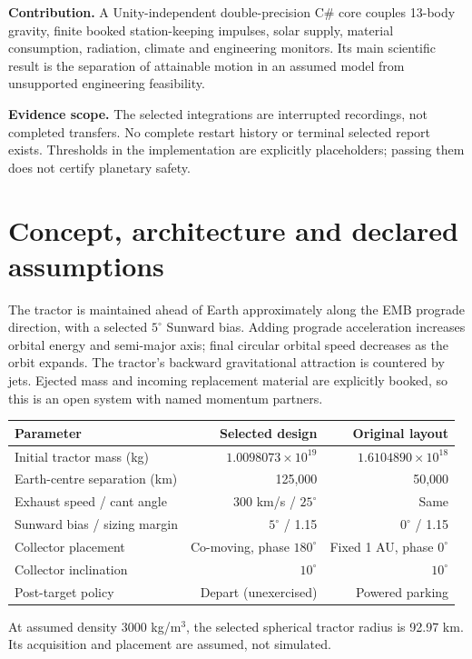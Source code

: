 ﻿\documentclass[10pt,a4paper]{article}
\begin{document}
\textbf{Contribution.} A Unity-independent double-precision C\# core couples 13-body gravity, finite booked station-keeping impulses, solar supply, material consumption, radiation, climate and engineering monitors. Its main scientific result is the separation of attainable motion in an assumed model from unsupported engineering feasibility.

\textbf{Evidence scope.} The selected integrations are interrupted recordings, not completed transfers. No complete restart history or terminal selected report exists. Thresholds in the implementation are explicitly placeholders; passing them does not certify planetary safety.


\newpage
\section{Concept, architecture and declared assumptions}
The tractor is maintained ahead of Earth approximately along the EMB prograde direction, with a selected $5^\circ$ Sunward bias. Adding prograde acceleration increases orbital energy and semi-major axis; final circular orbital speed decreases as the orbit expands. The tractor's backward gravitational attraction is countered by jets. Ejected mass and incoming replacement material are explicitly booked, so this is an open system with named momentum partners.

\par\smallskip
{\small\noindent\begin{tabularx}{\linewidth}{@{}Xrr@{}}\toprule
Parameter & Selected design & Original layout\\\midrule
Initial tractor mass (kg) & $1.0098073\times10^{19}$ & $1.6104890\times10^{18}$\\
Earth-centre separation (km) & 125,000 & 50,000\\
Exhaust speed / cant angle & 300 km/s / $25^\circ$ & Same\\
Sunward bias / sizing margin & $5^\circ$ / 1.15 & $0^\circ$ / 1.15\\
Collector placement & Co-moving, phase $180^\circ$ & Fixed 1 AU, phase $0^\circ$\\
Collector inclination & $10^\circ$ & $10^\circ$\\
Post-target policy & Depart (unexercised) & Powered parking\\\bottomrule
\end{tabularx}\par}
\smallskip


At assumed density 3000 kg/m$^3$, the selected spherical tractor radius is 92.97 km. Its acquisition and placement are assumed, not simulated.
\end{document}
